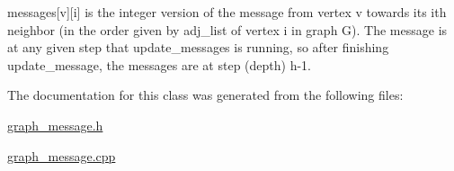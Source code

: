 messages\mbox{[}v\mbox{]}\mbox{[}i\mbox{]} is the integer version of the message from vertex v towards its ith neighbor (in the order given by adj\+\_\+list of vertex i in graph G). The message is at any given step that update\+\_\+messages is running, so after finishing update\+\_\+message, the messages are at step (depth) h-\/1. 



The documentation for this class was generated from the following files\+:\begin{DoxyCompactItemize}
\item 
\hyperlink{graph__message_8h}{graph\+\_\+message.\+h}\item 
\hyperlink{graph__message_8cpp}{graph\+\_\+message.\+cpp}\end{DoxyCompactItemize}
